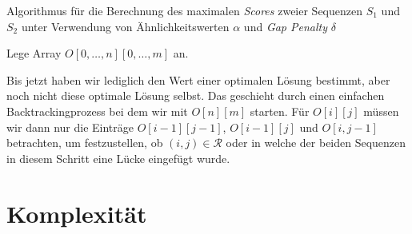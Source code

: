\begin{algorithm}
	\caption{Algorithmus für die Berechnung des maximalen \emph{Scores} zweier Sequenzen $S_1$ und $S_2$ unter Verwendung von Ähnlichkeitswerten $\alpha$ und \emph{Gap Penalty} $\delta$}
	\label{alg:opt_nw}
	\begin{algorithmic}[1]
		\State Lege Array $O[0,\dots,n][0,\dots,m]$ an.
		 
		\EndFor
		 
		\EndFor
			\EndFor
		\EndFor
		\EndProcedure
	\end{algorithmic}
\end{algorithm}

Bis jetzt haben wir lediglich den Wert einer optimalen Lösung bestimmt, aber noch nicht diese optimale Lösung selbst. Das geschieht durch einen einfachen Backtrackingprozess bei dem wir mit $O[n][m]$ starten. Für $O[i][j]$ müssen wir dann nur die Einträge $O[i-1][j-1]$, $O[i-1][j]$ und $O[i,j-1]$ betrachten, um festzustellen, ob $(i,j) \in \mathcal{R}$ oder in welche der beiden Sequenzen in diesem Schritt eine Lücke eingefügt wurde.

\section{Komplexität}








